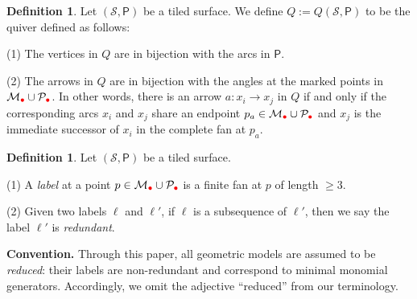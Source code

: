 \documentclass[11pt]{amsart}
\numberwithin{equation}{section}
\theoremstyle{definition}
\newtheorem{definition}[theorem]{Definition}
\newcommand{\rpoint}{\color{red}{\bullet}}
\begin{document}
\begin{definition}
 Let \( (\mathcal{S}, \mathsf{P}) \) be a tiled surface. We define \( Q := Q(\mathcal{S}, \mathsf{P}) \) to be the quiver defined as follows:
 
(1) The vertices in $Q$ are in bijection with the arcs in $\mathsf{P}$.

(2) The arrows in $Q$ are in bijection with the angles at the marked points in $ \mathcal{M}_{\rpoint}\cup\mathcal{P}_{\rpoint}$. In other words, there is an arrow $a\colon x_i \to x_j$ in $Q$ if and only if the corresponding arcs ${x}_i$ and ${x}_j$ share an endpoint $p_a \in \mathcal{M}_{\rpoint}\cup\mathcal{P}_{\rpoint}$ and ${x}_j$ is the immediate successor of ${x}_i$ in the complete fan at $p_a$.

\end{definition}
  
\begin{definition}\label{def:label}
    Let \( (\mathcal{S}, \mathsf{P}) \) be a tiled surface.

(1) A {\it label} at a point $p\in \mathcal{M}_{\rpoint}\cup\mathcal{P}_{\rpoint}$ is a finite fan at $p$ of length $\geq 3$.

(2) Given two labels $\ell$ and $\ell'$, if $\ell$ is a subsequence of $\ell'$, then we say the label $\ell'$ is {\it redundant}.

\end{definition}

\medskip
\noindent\textbf{Convention.}
Through this paper, all geometric models are assumed to be \emph{reduced}: their labels are non-redundant and correspond to minimal monomial generators. Accordingly, we omit the adjective “reduced” from our terminology.
\end{document}
